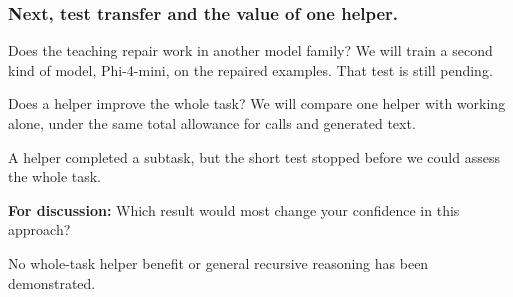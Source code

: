 \documentclass[aspectratio=169,12pt]{beamer}
\newcommand{\aside}[1]{\vfill{\footnotesize\color{Gray}#1\par}}
\begin{document}
\begin{frame}[t]
\frametitle{Next, test transfer and the value of one helper.}
\begin{block}{Does the teaching repair work in another model family?}
We will train a second kind of model, Phi-4-mini, on the repaired examples. That test is still pending.
\end{block}
\begin{block}{Does a helper improve the whole task?}
We will compare one helper with working alone, under the same total allowance for calls and generated text.
\end{block}
A helper completed a subtask, but the short test stopped before we could assess the whole task.
\medskip

\textbf{For discussion:} Which result would most change your confidence in this approach?
\aside{No whole-task helper benefit or general recursive reasoning has been demonstrated.}
\end{frame}
\end{document}
